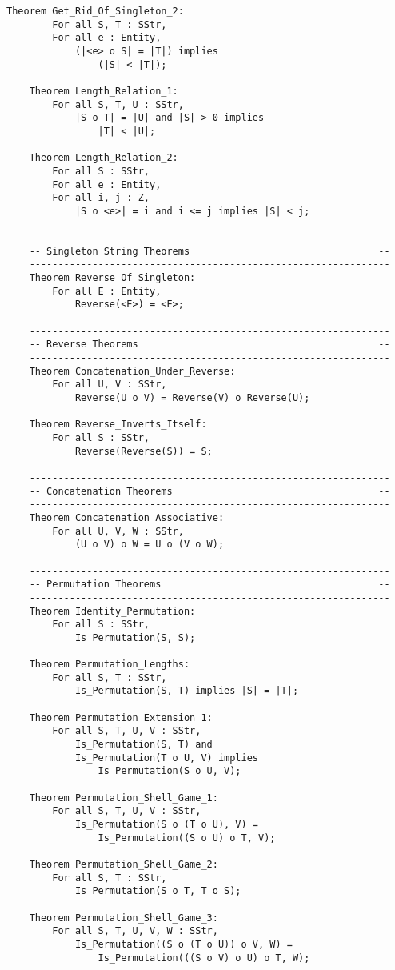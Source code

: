 \begin{lstlisting}[language=resolve]
	Theorem Get_Rid_Of_Singleton_2:
		For all S, T : SStr,
		For all e : Entity,
			(|<e> o S| = |T|) implies
				(|S| < |T|);

	Theorem Length_Relation_1:
		For all S, T, U : SStr,
			|S o T| = |U| and |S| > 0 implies
				|T| < |U|;

	Theorem Length_Relation_2:
		For all S : SStr,
		For all e : Entity,
		For all i, j : Z,
			|S o <e>| = i and i <= j implies |S| < j;

	---------------------------------------------------------------
	-- Singleton String Theorems                                 --
	---------------------------------------------------------------
	Theorem Reverse_Of_Singleton:
		For all E : Entity,
			Reverse(<E>) = <E>;

	---------------------------------------------------------------
	-- Reverse Theorems                                          --
	---------------------------------------------------------------
	Theorem Concatenation_Under_Reverse:
		For all U, V : SStr,
			Reverse(U o V) = Reverse(V) o Reverse(U);

	Theorem Reverse_Inverts_Itself:
		For all S : SStr,
			Reverse(Reverse(S)) = S;

	---------------------------------------------------------------
	-- Concatenation Theorems                                    --
	---------------------------------------------------------------
	Theorem Concatenation_Associative:
		For all U, V, W : SStr,
			(U o V) o W = U o (V o W);

	---------------------------------------------------------------
	-- Permutation Theorems                                      --
	---------------------------------------------------------------
	Theorem Identity_Permutation:
		For all S : SStr,
			Is_Permutation(S, S);

	Theorem Permutation_Lengths:
		For all S, T : SStr,
			Is_Permutation(S, T) implies |S| = |T|;

	Theorem Permutation_Extension_1:
		For all S, T, U, V : SStr,
			Is_Permutation(S, T) and
			Is_Permutation(T o U, V) implies
				Is_Permutation(S o U, V);

	Theorem Permutation_Shell_Game_1:
		For all S, T, U, V : SStr,
			Is_Permutation(S o (T o U), V) =
				Is_Permutation((S o U) o T, V);

	Theorem Permutation_Shell_Game_2:
		For all S, T : SStr,
			Is_Permutation(S o T, T o S);

	Theorem Permutation_Shell_Game_3:
		For all S, T, U, V, W : SStr,
			Is_Permutation((S o (T o U)) o V, W) =
				Is_Permutation(((S o V) o U) o T, W);


\end{lstlisting}
